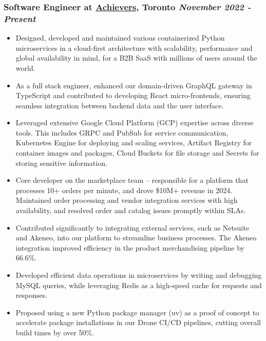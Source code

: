 \documentclass[a4paper,10pt]{article}
\begin{document}
\subsubsection*{%
  \textbf{Software Engineer} at \href{https://www.achievers.com/}{Achievers}, Toronto
  \hfill
  \textit{November 2022 - Present}
}
\begin{itemize}
  \item Designed, developed and maintained various containerized Python microservices in a cloud-first architecture with scalability,
    performance and global availability in mind, for a B2B SaaS with millions of users around the world.

  \item As a full stack engineer, enhanced our domain-driven GraphQL gateway in TypeScript and contributed to
    developing React micro-frontends, ensuring seamless integration between backend data and the user interface.

  \item Leveraged extensive Google Cloud Platform (GCP) expertise across diverse tools. This includes GRPC and PubSub for service communication,
    Kubernetes Engine for deploying and scaling services, Artifact Registry for container images and packages,
    Cloud Buckets for file storage and Secrets for storing sensitive information.

  \item Core developer on the marketplace team -- responsible for a platform that processes 10+ orders per minute, and drove \$10M+ revenue in 2024.
    Maintained order processing and vendor integration services with high availability, and resolved order and catalog issues promptly within SLAs.

  \item Contributed significantly to integrating external services, such as Netsuite and Akeneo,
    into our platform to streamline business processes.
    The Akeneo integration improved efficiency in the product merchandising pipeline by 66.6\%.

  \item Developed efficient data operations in microservices by writing and debugging MySQL queries,
    while leveraging Redis as a high-speed cache for requests and responses.
  \item Proposed using a new Python package manager (uv) as a proof of concept to accelerate package installations in our Drone CI/CD
    pipelines, cutting overall build times by over 50\%.
\end{itemize}
\end{document}
